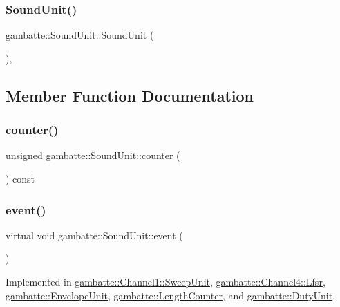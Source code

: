 \subsubsection{\texorpdfstring{Sound\+Unit()}{SoundUnit()}}
{\footnotesize\ttfamily gambatte\+::\+Sound\+Unit\+::\+Sound\+Unit (\begin{DoxyParamCaption}{ }\end{DoxyParamCaption})\hspace{0.3cm}{\ttfamily [inline]}, {\ttfamily [protected]}}



\subsection{Member Function Documentation}
\mbox{\label{classgambatte_1_1SoundUnit_acad13952e5b24b3bc05b9aa42c8b9249}} 
\subsubsection{\texorpdfstring{counter()}{counter()}}
{\footnotesize\ttfamily unsigned gambatte\+::\+Sound\+Unit\+::counter (\begin{DoxyParamCaption}{ }\end{DoxyParamCaption}) const\hspace{0.3cm}{\ttfamily [inline]}}

\mbox{\label{classgambatte_1_1SoundUnit_a8ad6df87fc3700d9d3bee470383197b4}} 
\subsubsection{\texorpdfstring{event()}{event()}}
{\footnotesize\ttfamily virtual void gambatte\+::\+Sound\+Unit\+::event (\begin{DoxyParamCaption}{ }\end{DoxyParamCaption})\hspace{0.3cm}{\ttfamily [pure virtual]}}



Implemented in \hyperlink{classgambatte_1_1Channel1_1_1SweepUnit_a17c182372fc3f4aaf845ab89cf20201d}{gambatte\+::\+Channel1\+::\+Sweep\+Unit}, \hyperlink{classgambatte_1_1Channel4_1_1Lfsr_a019ab6fad6c598fdc6f061b70df93fdc}{gambatte\+::\+Channel4\+::\+Lfsr}, \hyperlink{classgambatte_1_1EnvelopeUnit_a9273d36ce1ef6e3e11a4d2bb0d3bc367}{gambatte\+::\+Envelope\+Unit}, \hyperlink{classgambatte_1_1LengthCounter_ab0d3eda374d487f8a0b79ea447cca91a}{gambatte\+::\+Length\+Counter}, and \hyperlink{classgambatte_1_1DutyUnit_a2f051bb4772d30c58f2e88b85e947e61}{gambatte\+::\+Duty\+Unit}.


